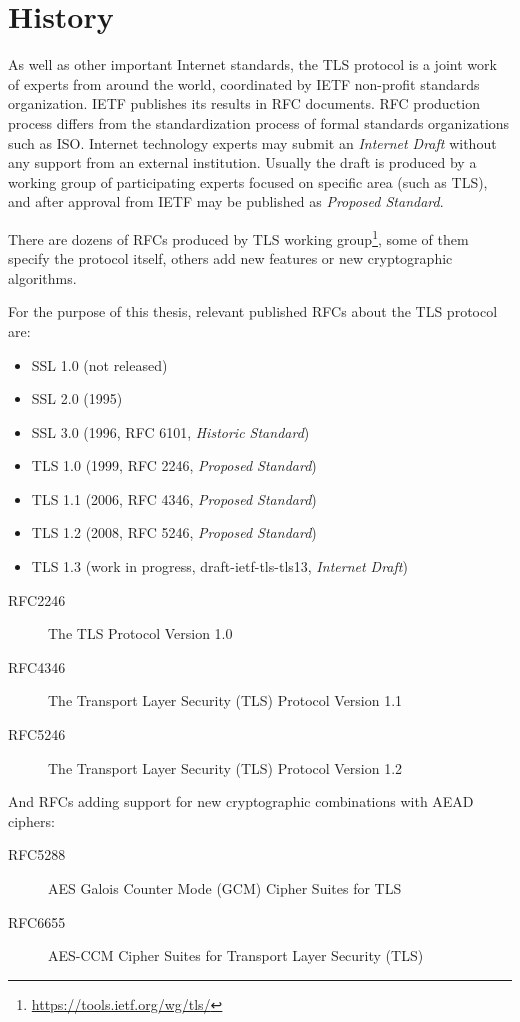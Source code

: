 \section{History}

As well as other important Internet standards, the TLS protocol is a joint work of experts from around the world, coordinated by IETF non-profit standards organization. IETF publishes its results in RFC documents. RFC production process differs from the standardization process of formal standards organizations such as ISO.  Internet technology experts may submit an \textit{Internet Draft} without any support from an external institution. Usually the draft is produced by a working group of participating experts focused on specific area (such as TLS), and after approval from IETF may be published as \textit{Proposed Standard}.



There are dozens of RFCs produced by TLS working group\footnote{\url{https://tools.ietf.org/wg/tls/}}, some of them specify the protocol itself, others add new features or new cryptographic algorithms.

For the purpose of this thesis, relevant published RFCs about the TLS protocol are:

\begin{itemize}
  \item SSL 1.0 (not released)
  \item SSL 2.0 (1995)
  \item SSL 3.0 (1996, RFC 6101, \textit{Historic Standard})
  \item TLS 1.0 (1999, RFC 2246, \textit{Proposed Standard})
  \item TLS 1.1 (2006, RFC 4346, \textit{Proposed Standard})
  \item TLS 1.2 (2008, RFC 5246, \textit{Proposed Standard})
  \item TLS 1.3 (work in progress, draft-ietf-tls-tls13, \textit{Internet Draft})
\end{itemize}

\begin{description}
  \item[RFC2246] The TLS Protocol Version 1.0
  \item[RFC4346] The Transport Layer Security (TLS) Protocol Version 1.1
  \item[RFC5246] The Transport Layer Security (TLS) Protocol Version 1.2
\end{description}

And RFCs adding support for new cryptographic combinations with AEAD ciphers:

\begin{description}
  \item[RFC5288] AES Galois Counter Mode (GCM) Cipher Suites for TLS
  \item[RFC6655] AES-CCM Cipher Suites for Transport Layer Security (TLS)
\end{description}

